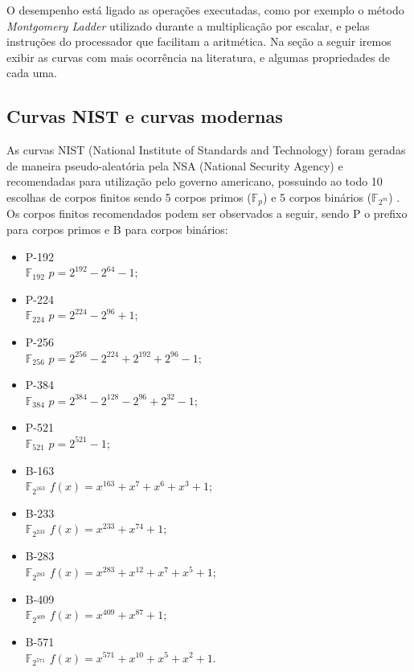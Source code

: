 O desempenho está ligado as operações executadas, como por exemplo o método \emph{Montgomery Ladder} utilizado durante a multiplicação por escalar, e pelas instruções do processador que facilitam a aritmética. Na seção a seguir iremos exibir as curvas com mais ocorrência na literatura, e algumas propriedades de cada uma.

\subsection{Curvas NIST e curvas modernas}

As curvas NIST (National Institute of Standards and Technology) foram geradas de maneira pseudo-aleatória pela NSA (National Security Agency) e recomendadas para utilização pelo governo americano, possuindo ao todo 10 escolhas de corpos finitos sendo 5 corpos primos ($\mathbb{F}_p$) e 5 corpos binários ($\mathbb{F}_{2^m}$) \cite{Brown2001}. Os corpos finitos recomendados podem ser observados a seguir, sendo P o prefixo para corpos primos e B para corpos binários:

\begin{multicols}{2}
\begin{itemize}
\item P-192 \\ $\mathbb{F}_{192}$ $p = 2^{192} - 2^{64} - 1$; 
\item P-224 \\ $\mathbb{F}_{224}$ $p = 2^{224} - 2^{96} + 1$;
\item P-256 \\ $\mathbb{F}_{256}$ $p = 2^{256} - 2^{224} + 2^{192} + 2^{96} - 1$;
\item P-384 \\ $\mathbb{F}_{384}$ $p = 2^{384} - 2^{128} - 2^{96} + 2^{32} - 1$;
\item P-521 \\ $\mathbb{F}_{521}$ $p = 2^{521} - 1$;
\item B-163 \\ $\mathbb{F}_{2^{163}}$ $f(x) = x^{163} + x^7 + x^6 + x^3 + 1$;
\item B-233 \\ $\mathbb{F}_{2^{233}}$ $f(x) = x^{233} + x^{74} + 1$;
\item B-283 \\ $\mathbb{F}_{2^{283}}$ $f(x) = x^{283} + x^{12} + x^7 + x^5 + 1$;
\item B-409 \\ $\mathbb{F}_{2^{409}}$ $f(x) = x^{409} + x ^{87} + 1$;
\item B-571 \\ $\mathbb{F}_{2^{571}}$ $f(x) = x^{571} + x^{10} + x^5 + x^2 + 1$.
\end{itemize}
\end{multicols}

